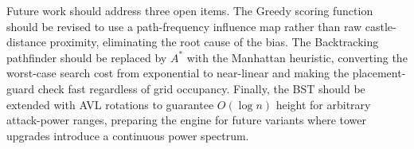 \documentclass[conference]{IEEEtran}
\begin{document}
Future work should address three open items.
The Greedy scoring function should be revised to use a path-frequency influence
map rather than raw castle-distance proximity, eliminating the root cause of
the bias.
The Backtracking pathfinder should be replaced by $A^*$ with the Manhattan
heuristic, converting the worst-case search cost from exponential to
near-linear and making the placement-guard check fast regardless of grid
occupancy.
Finally, the BST should be extended with AVL rotations to guarantee
$O(\log n)$ height for arbitrary attack-power ranges, preparing the engine for
future variants where tower upgrades introduce a continuous power spectrum.



\end{document}
